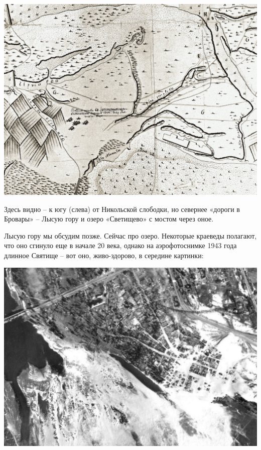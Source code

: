\begin{center}
\includegraphics[width=\linewidth]{chast-gorodki/cherto/s_svyat-1750.jpg}
\end{center}

Здесь видно – к югу (слева) от Никольской слободки, но севернее «дороги в Бровары» – Лысую гору и озеро «Светищево» с мостом через оное. 

Лысую гору мы обсудим позже. Сейчас про озеро. Некоторые краеведы полагают, что оно сгинуло еще в начале 20 века, однако на аэрофотоснимке 1943 года длинное Святище – вот оно, живо-здорово, в середине картинки:

\begin{center}
\includegraphics[width=\linewidth]{chast-gorodki/cherto/svyat-1943.jpg}
\end{center}

